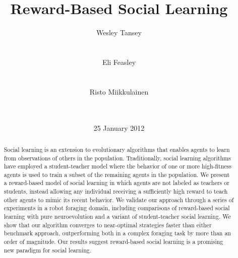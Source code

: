 \documentclass{acm_proc_article-sp}
\begin{document}
\title{Reward-Based Social Learning}

\author{
\alignauthor
Wesley Tansey\\
       \\
       \\
\alignauthor
Eli Feasley\\
       \\
       \\
\alignauthor
Risto Miikkulainen\\
       \\
       \\
}
\date{25 January 2012}

\maketitle
\begin{abstract}
Social learning is an extension to evolutionary algorithms that enables agents to learn from observations of others in the population. Traditionally, social learning algorithms have employed a student-teacher model where the behavior of one or more high-fitness agents is used to train a subset of the remaining agents in the population. We present a reward-based model of social learning in which agents are not labeled as teachers or students, instead allowing any individual receiving a sufficiently high reward to teach other agents to mimic its recent behavior. We validate our approach through a series of experiments in a robot foraging domain, including comparisons of reward-based social learning with pure neuroevolution and a variant of student-teacher social learning. We show that our algorithm converges to near-optimal strategies faster than either benchmark approach, outperforming both in a complex foraging task by more than an order of magnitude. Our results suggest reward-based social learning is a promising new paradigm for social learning.
\end{abstract}

\end{document}
